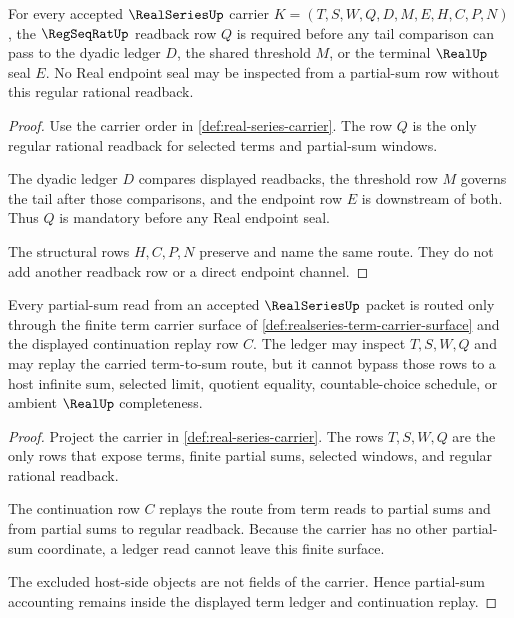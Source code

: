 \begin{theorem}
\label{thm:realseries-regseqrat-tail-obligation}
For every accepted $\RealSeriesUp$ carrier $K=(T,S,W,Q,D,M,E,H,C,P,N)$, the $\RegSeqRatUp$ readback row $Q$ is required before any tail comparison can pass to the dyadic ledger $D$, the shared threshold $M$, or the terminal $\RealUp$ seal $E$. No Real endpoint seal may be inspected from a partial-sum row without this regular rational readback.
\end{theorem}
\begin{proof}
Use the carrier order in \autoref{def:real-series-carrier}. The row $Q$ is the only regular rational readback for selected terms and partial-sum windows.

The dyadic ledger $D$ compares displayed readbacks, the threshold row $M$ governs the tail after those comparisons, and the endpoint row $E$ is downstream of both. Thus $Q$ is mandatory before any Real endpoint seal.

The structural rows $H,C,P,N$ preserve and name the same route. They do not add another readback row or a direct endpoint channel.
\end{proof}

\begin{theorem}
\label{thm:realseries-partial-sum-ledger-nonescape}
Every partial-sum read from an accepted $\RealSeriesUp$ packet is routed only through the finite term carrier surface of \autoref{def:realseries-term-carrier-surface} and the displayed continuation replay row $C$. The ledger may inspect $T,S,W,Q$ and may replay the carried term-to-sum route, but it cannot bypass those rows to a host infinite sum, selected limit, quotient equality, countable-choice schedule, or ambient $\RealUp$ completeness.
\end{theorem}
\begin{proof}
Project the carrier in \autoref{def:real-series-carrier}. The rows $T,S,W,Q$ are the only rows that expose terms, finite partial sums, selected windows, and regular rational readback.

The continuation row $C$ replays the route from term reads to partial sums and from partial sums to regular readback. Because the carrier has no other partial-sum coordinate, a ledger read cannot leave this finite surface.

The excluded host-side objects are not fields of the carrier. Hence partial-sum accounting remains inside the displayed term ledger and continuation replay.
\end{proof}

